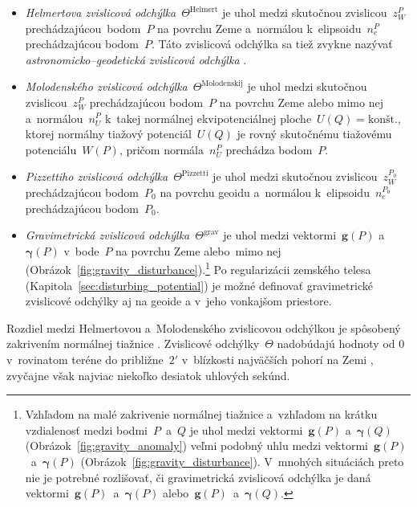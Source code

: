 \documentclass[a4paper, 12pt]{book}
\let\vec\mathbf
\begin{document}
\begin{itemize}
\item \emph{Helmertova zvislicová odchýlka}~$\Theta^\mathrm{Helmert}$ je uhol 
medzi skutočnou zvislicou~$z_W^P$ prechádzajúcou~bodom~$P$ na povrchu Zeme 
a~normálou k~elipsoidu~$n_e^P$ prechádzajúcou bodom~$P$.  Táto zvislicová 
odchýlka sa tiež zvykne nazývať \textit{astronomicko--geodetická zvislicová 
odchýlka} \parencite{Jekeli1999b}.

\item \emph{Molodenského zvislicová odchýlka}~$\Theta^\mathrm{Molodenskij}$ je 
uhol medzi skutočnou zvislicou~$z_W^P$ prechádzajúcou bodom~$P$ na povrchu Zeme 
alebo mimo nej a~normálou~$n_U^P$ k~takej normálnej ekvipotenciálnej 
ploche~$U(Q) = \textrm{kon\v{s}t.}$, ktorej normálny tiažový potenciál~$U(Q)$ 
je rovný skutočnému tiažovému potenciálu~$W(P)$, pričom normála~$n_U^P$ 
prechádza bodom~$P$.

\item \emph{Pizzettiho zvislicová odchýlka}~$\Theta^\mathrm{Pizzetti}$ je uhol 
medzi skutočnou zvislicou~$z_W^{P_0}$ prechádzajúcou bodom~$P_0$ na povrchu 
geoidu a~normálou k~elipsoidu~$n_e^{P_0}$ prechádzajúcou bodom~$P_0$.

\item \emph{Gravimetrická zvislicová odchýlka}~$\Theta^\mathrm{grav}$ je uhol 
medzi vektormi~$\vec g(P)$ a~$\boldsymbol\gamma(P)$ v~bode~$P$ na povrchu Zeme 
alebo~mimo nej (Obrázok~\ref{fig:gravity_disturbance}).\footnote{Vzhľadom na 
malé zakrivenie normálnej tiažnice a~vzhľadom na krátku vzdialenosť medzi 
bodmi~$P$~a~$Q$ je uhol medzi vektormi~$\vec g(P)$ a~$\boldsymbol\gamma(Q)$ 
(Obrázok~\ref{fig:gravity_anomaly}) veľmi podobný uhlu medzi vektormi~$\vec 
g(P)$~a~$\boldsymbol\gamma(P)$ (Obrázok~\ref{fig:gravity_disturbance}).  
V~mnohých situáciách preto nie je potrebné rozlišovať, či gravimetrická 
zvislicová odchýlka je daná vektormi~$\vec g(P)$~a~$\boldsymbol\gamma(P)$ 
alebo~$\vec g(P)$~a~$\boldsymbol\gamma(Q)$.}  Po regularizácii zemského telesa 
(Kapitola~\ref{sec:disturbing_potential}) je možné definovať gravimetrické 
zvislicové odchýlky aj na geoide a v~jeho vonkajšom priestore.
\end{itemize}
%
Rozdiel medzi Helmertovou a~Molodenského zvislicovou odchýlkou je spôsobený 
zakrivením normálnej tiažnice \parencite{Jekeli1999b}.  Zvislicové 
odchýlky~$\Theta$ nadobúdajú hodnoty od $0$ v~rovinatom teréne do 
približne~$2'$ v~blízkosti najväčších pohorí na Zemi \parencite{GGMplus}, 
zvyčajne však najviac niekoľko desiatok uhlových sekúnd.
\end{document}
